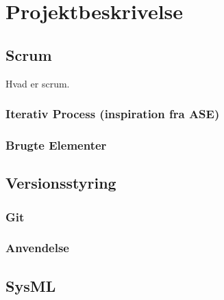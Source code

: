 \chapter{Projektbeskrivelse}

\section{Scrum}

Hvad er scrum.

\subsection{Iterativ Process (inspiration fra ASE)}

\subsection{Brugte Elementer}

\section{Versionsstyring}

\subsection{Git}

\subsection{Anvendelse}

\section{SysML}